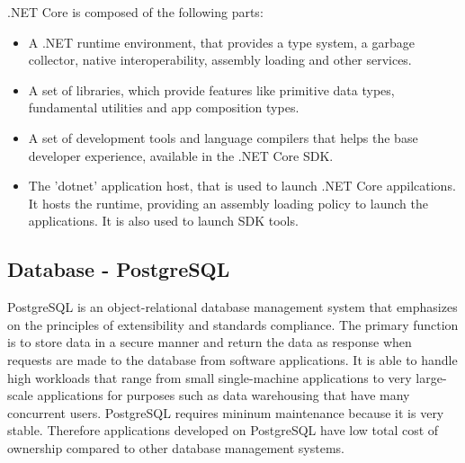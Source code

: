 \documentclass[../thesis.tex]{subfiles}
\begin{document}
.NET Core is composed of the following parts:
\begin{itemize}
\item A .NET runtime environment, that provides a type system, a garbage collector, native interoperability, assembly loading and other services.
   
\item A set of libraries, which provide features like primitive data types, fundamental utilities and app composition types.
   
\item A set of development tools and language compilers that helps the base developer experience, available in the .NET Core SDK.

\item The 'dotnet' application host, that is used to launch .NET Core appilcations. It hosts the runtime, providing an assembly loading policy to launch the applications. It is also used to launch SDK tools.
\end{itemize}

\subsection{Database - PostgreSQL}
PostgreSQL is an object-relational database management system that emphasizes on the principles of extensibility and standards compliance. The primary function is to store data in a secure manner and return the data as response when requests are made to the database from software applications. It is able to handle high workloads that range from small single-machine applications to very large-scale applications for purposes such as data warehousing that have many concurrent users. 
PostgreSQL requires mininum maintenance because it is very stable. Therefore applications developed on PostgreSQL have low total cost of ownership compared to other database management systems.
\linebreak
\end{document}
